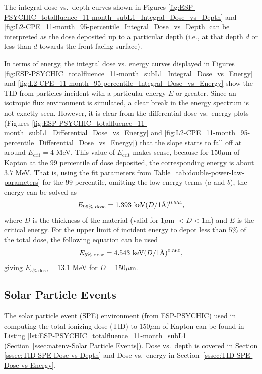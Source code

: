 \documentclass{hitec}
\newcommand{\angstrom}{\mbox{\normalfont\AA}}
\begin{document}
The integral dose vs.\ depth curves shown in Figures \ref{fig:ESP-PSYCHIC_totalfluence_11-month_subL1_Integral_Dose_vs_Depth} and \ref{fig:L2-CPE_11-month_95-percentile_Integral_Dose_vs_Depth} can be interpreted as the dose deposited up to a particular depth (i.e., at that depth $d$ or less than $d$ towards the front facing surface).

In terms of energy, the integral dose vs. energy curves displayed in Figures \ref{fig:ESP-PSYCHIC_totalfluence_11-month_subL1_Integral_Dose_vs_Energy} and \ref{fig:L2-CPE_11-month_95-percentile_Integral_Dose_vs_Energy} show the TID from particles incident with a particular energy $E$ or greater. Since an isotropic flux environment is simulated, a clear break in the energy spectrum is not exactly seen. However, it is clear from the differential dose vs.\ energy plots (Figures \ref{fig:ESP-PSYCHIC_totalfluence_11-month_subL1_Differential_Dose_vs_Energy} and \ref{fig:L2-CPE_11-month_95-percentile_Differential_Dose_vs_Energy}) that the slope starts to fall off at around $E_{\text{crit}}=4$ MeV. This value of  $E_{\text{crit}}$ makes sense, because for $150 \mu$m of Kapton at the $99$ percentile of dose deposited, the corresponding energy is about $3.7$ MeV. That is, using the fit parameters from Table~\ref{tab:double-power-law-parameters} for the $99$ percentile, omitting the low-energy terms ($a$ and $b$), the energy can be solved as
\begin{equation}
	E_{99\% \text{ dose}} = 1.393 \text{ keV} (D/ 1 \angstrom)^{0.554},
\end{equation}
where $D$ is the thickness of the material (valid for $1 \mu$m $< D < 1$m) and $E$ is the critical energy. For the upper limit of incident energy to depot less than $5\%$ of the total dose, the following equation can be used
\begin{equation}\label{eq:E_5perc}
	E_{5\% \text{ dose}} = 4.543 \text{ keV} (D/ 1 \angstrom)^{0.560},
\end{equation}
giving $E_{5\% \text{ dose}} = 13.1$ MeV for $D = 150\mu$m.


\subsection{Solar Particle Events}
\label{ssec:TID-Solar Particle Events}

The solar particle event (SPE) environment (from ESP-PSYCHIC) used in computing the total ionizing dose (TID) to $150 \mu$m of Kapton can be found in Listing \ref{lst:ESP-PSYCHIC_totalfluence_11-month_subL1} (Section~\ref{ssec:natenv-Solar Particle Events}).  Dose vs.\ depth is covered in Section \ref{sssec:TID-SPE-Dose vs Depth} and Dose vs.\ energy in Section~\ref{sssec:TID-SPE-Dose vs Energy}.
\end{document}
